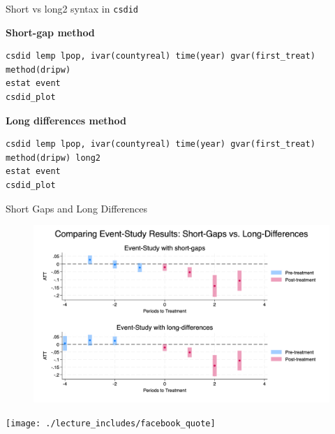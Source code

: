 \documentclass{beamer}
\begin{document}
\begin{frame}[fragile]{Short vs long2 syntax in \texttt{csdid}}
\tiny

\textbf{Short-gap method}
\begin{lstlisting}[basicstyle=\ttfamily]
csdid lemp lpop, ivar(countyreal) time(year) gvar(first_treat) method(dripw)
estat event
csdid_plot
\end{lstlisting}


\textbf{Long differences method}
\begin{lstlisting}[basicstyle=\ttfamily]
csdid lemp lpop, ivar(countyreal) time(year) gvar(first_treat) method(dripw) long2
estat event
csdid_plot
\end{lstlisting}
\end{frame}


\begin{frame}{Short Gaps and Long Differences}

\begin{figure}[h]
    \centering
    \includegraphics[width=\linewidth, height=0.8\textheight, keepaspectratio]{./lecture_includes/short_long}
\end{figure}

\end{frame}




\begin{frame}
\begin{center}
\texttt{[image: ./lecture\_includes/facebook\_quote]}
\end{center}
\end{frame}
\end{document}
